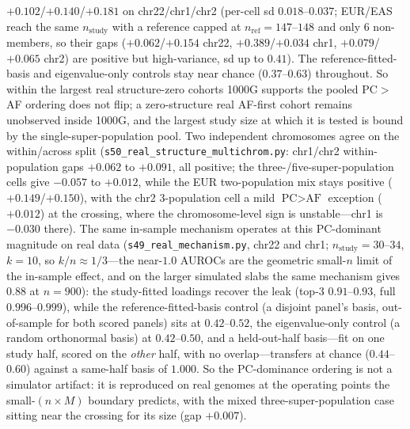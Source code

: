 \documentclass[11pt]{article}
\begin{document}
$+0.102$/$+0.140$/$+0.181$ on chr22/chr1/chr2 (per-cell sd $0.018$--$0.037$;
EUR/EAS reach the same $n_{\text{study}}$ with a reference capped at
$n_{\text{ref}}{=}147$--$148$ and only $6$ non-members, so their gaps
($+0.062$/$+0.154$ chr22, $+0.389$/$+0.034$ chr1, $+0.079$/$+0.065$ chr2) are
positive but high-variance, sd up to $0.41$). The reference-fitted-basis
and eigenvalue-only controls stay near chance ($0.37$--$0.63$) throughout. So within
the largest real structure-zero cohorts 1000G supports the pooled PC$>$AF ordering
does not flip; a
zero-structure real
AF-first cohort remains unobserved inside 1000G, and the largest study size at
which it is tested is bound by the single-super-population pool.
Two independent
chromosomes agree on the within/across split
(\texttt{s50\_real\_structure\_multichrom.py}: chr1/chr2 within-population gaps
$+0.062$ to $+0.091$, all positive; the three-/five-super-population cells give
$-0.057$ to $+0.012$, while the EUR two-population mix stays positive
($+0.149$/$+0.150$),
with the chr2 3-population cell a mild $\text{PC}>\text{AF}$ exception
($+0.012$) at the crossing, where the chromosome-level sign is
unstable---chr1 is $-0.030$ there). The same in-sample mechanism
operates at this
PC-dominant magnitude on real data (\texttt{s49\_real\_mechanism.py}, chr22 and
chr1; $n_{\text{study}}{=}30$--$34$, $k{=}10$, so $k/n\approx1/3$---the
near-$1.0$
AUROCs are the geometric small-$n$ limit of the in-sample effect, and on the
larger simulated slabs the same mechanism gives $0.88$ at $n{=}900$): the
study-fitted loadings recover the leak (top-3 $0.91$--$0.93$, full
$0.996$--$0.999$), while the reference-fitted-basis control (a disjoint panel's
basis, out-of-sample for both scored panels) sits at $0.42$--$0.52$, the
eigenvalue-only control (a random orthonormal basis) at $0.42$--$0.50$, and a
held-out-half basis---fit on one study half, scored on the \emph{other} half,
with no overlap---transfers at chance ($0.44$--$0.60$) against a same-half basis
of $1.000$. So the PC-dominance ordering is not a simulator artifact:
it is reproduced on real genomes at the operating points the small-$(n{\times}M)$
boundary predicts, with the mixed three-super-population case sitting near the
crossing for its size (gap $+0.007$).
\end{document}
